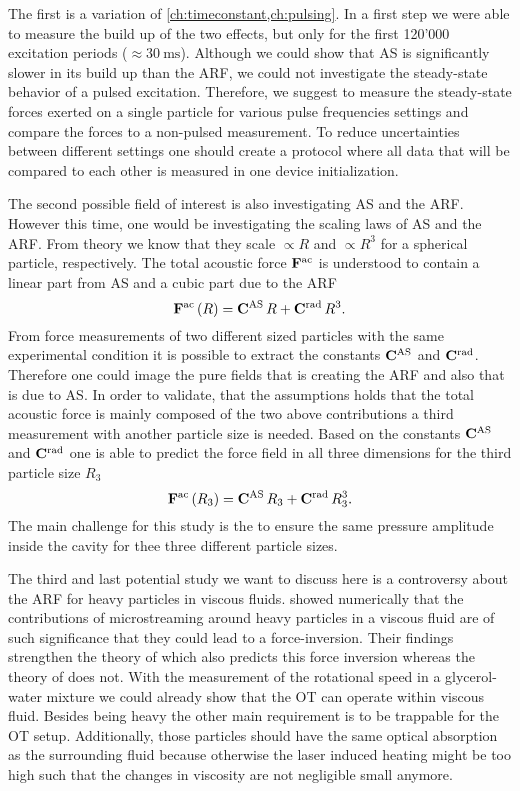 The first is a variation of \cref{ch:timeconstant,ch:pulsing}. In a first step 
we were able to measure the build up of the two effects, but only for the first 
120'000 excitation periods ($\approx \SI{30}{\ms}$). Although we could show 
that AS is significantly slower in its build up than the ARF, we could not 
investigate the steady-state behavior of a pulsed excitation. Therefore, we 
suggest to measure the steady-state forces exerted on a single particle for 
various pulse frequencies settings and compare the forces to a non-pulsed 
measurement. To reduce uncertainties between different settings one should 
create a protocol where all data that will be compared to each other is 
measured in one device initialization.

The second possible field of interest is also investigating AS and the ARF. 
However this time, one would be investigating the scaling laws of AS and the 
ARF. From theory we know that they scale $\propto R$ and $\propto R^{3}$ for a 
spherical particle, respectively. The total acoustic force 
$\vb{F}^{\mathrm{ac}}$ is understood to contain a linear part from AS and a 
cubic part due to the ARF
\begin{equation}
  \vb{F}^{\mathrm{ac}}\left( R \right) = \vb{C}^{\mathrm{AS}}\,R + 
  \vb{C}^{\mathrm{rad}}\,R^{3}.
\end{equation}
From force measurements of two different sized particles with the same 
experimental condition it is possible to extract the constants 
$\vb{C}^{\mathrm{AS}}$ and $\vb{C}^{\mathrm{rad}}$. Therefore one could image the pure 
fields that is creating the ARF and also that is due to AS. In order to 
validate, that the assumptions holds that the total acoustic force is mainly 
composed of the two above contributions a third measurement with another 
particle size is needed. Based on the constants $\vb{C}^{\mathrm{AS}}$ and 
$\vb{C}^{\mathrm{rad}}$ one is able to predict the force field in all three 
dimensions for the third particle size $R_{3}$
\begin{equation}
  \vb{F}^{\mathrm{ac}}\left( R_{3} \right) = \vb{C}^{\mathrm{AS}}\,R_{3} + 
  \vb{C}^{\mathrm{rad}}\,R^{3}_{3}.
\end{equation}
The main challenge for this study is the to ensure the same pressure amplitude 
inside the cavity for thee three different particle sizes.

The third and last potential study we want to discuss here is a controversy 
about the ARF for heavy particles in viscous fluids.  showed 
numerically that the contributions of microstreaming around heavy particles in 
a viscous fluid are of such significance that they could lead to a 
force-inversion. Their findings strengthen the theory of 
 which also predicts this force inversion whereas the 
theory of  does not. With the measurement of the rotational 
speed in a glycerol-water mixture we could already show that the OT can operate 
within viscous fluid. Besides being heavy the other main requirement is to be 
trappable for the OT setup. Additionally, those particles should have the same 
optical absorption as the surrounding fluid because otherwise the laser induced 
heating might be too high such that the changes in viscosity are not negligible 
small anymore.

